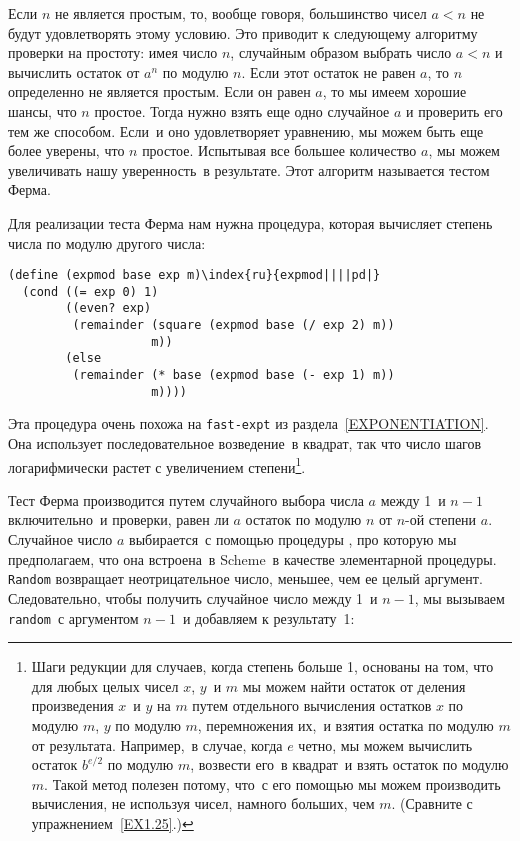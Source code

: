 Если $n$ не является простым, то, вообще
говоря, большинство чисел \mbox{$a < n$} не будут удовлетворять
этому условию.  Это приводит к следующему алгоритму проверки на
простоту:%
%
%
имея число $n$, случайным образом выбрать число 
\mbox{$a < n$} и вычислить остаток от $a^n$ по
модулю $n$.  Если этот остаток не равен $a$, то
$n$ определенно не является простым.  Если он равен
$a$, то мы имеем хорошие шансы, что $n$
простое. Тогда нужно взять еще одно случайное $a$ и
проверить его тем же способом.  Если~и оно удовлетворяет уравнению, мы 
можем быть еще более уверены, что $n$ простое.  Испытывая
все большее количество $a$, мы можем увеличивать нашу
уверенность~в результате.  Этот алгоритм называется тестом Ферма.

Для реализации теста Ферма нам нужна процедура, которая
вычисляет степень числа по модулю другого числа:

\begin{Verbatim}[fontsize=\small]
(define (expmod base exp m)\index{ru}{expmod||||pd|}
  (cond ((= exp 0) 1)
        ((even? exp)
         (remainder (square (expmod base (/ exp 2) m))
                    m))
        (else
         (remainder (* base (expmod base (- exp 1) m))
                    m))))
\end{Verbatim}
Эта процедура очень похожа на {\tt fast-expt} из 
раздела~\ref{EXPONENTIATION}. Она использует последовательное
возведение~в квадрат, так что число шагов логарифмически растет с
увеличением степени\footnote{Шаги редукции для случаев, когда степень больше 1,
основаны на том, что для любых целых чисел $x$,
$y$~и $m$ мы можем найти остаток от деления
произведения $x$~и $y$ на $m$ путем
отдельного вычисления остатков $x$ по модулю
$m$, $y$ по модулю $m$, перемножения
их,~и взятия остатка по модулю $m$ от результата.
Например,~в случае, когда $e$ четно, мы можем вычислить
остаток $b^{e / 2}$ по модулю $m$, возвести
его~в квадрат~и взять остаток по модулю $m$.  Такой метод
полезен потому, что~с его помощью мы можем производить вычисления, не
используя чисел, намного больших, чем $m$. (Сравните с
упражнением~\ref{EX1.25}.)}.

Тест Ферма производится путем случайного выбора числа
$a$ между 1~и $n - 1$ включительно~и проверки,
равен ли $a$ остаток по модулю $n$ от
$n$-ой степени $a$.  Случайное число
$a$ выбирается~с помощью процедуры ,
про которую мы предполагаем, что она встроена~в Scheme~в качестве
элементарной процедуры. {\tt Random} возвращает неотрицательное
число, меньшее, чем ее целый аргумент.  Следовательно, чтобы получить
случайное число между 1~и $n - 1$, мы вызываем
{\tt random}~с аргументом $n - 1$~и добавляем к
результату~1:

